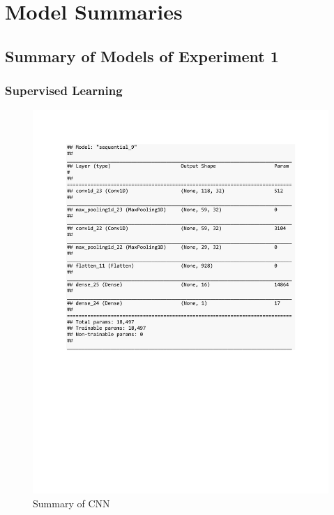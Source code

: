 
\chapter{Model Summaries} %

\label{AppendixA} %

\section{Summary of Models of Experiment 1}

\subsection{Supervised Learning}
\begin{figure}[h]
	\centering
	\includegraphics[scale=0.5]{Figures/summary_CNN_class_syn}
	\decoRule
	\caption[Synthetic Anomalies]{Summary of CNN \parencite{own}}
	\label{fig:summary_CNN_class_syn}
\end{figure}

